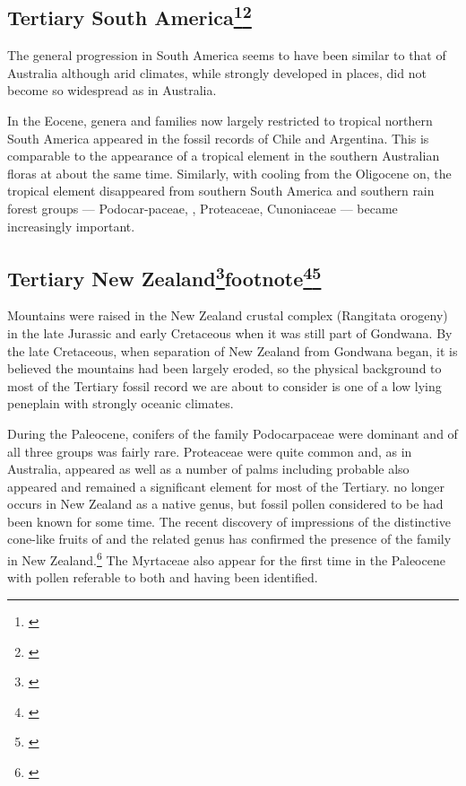 \subsection[Tertiary South America]{Tertiary South America\footnote{\cite{wace1965vascular}}\footnote{\cite{kemp1978tertiary}}}

The general progression in South America seems to have been similar to that of Australia although arid climates, while strongly developed in places, did not become so widespread as in Australia.

In the Eocene, genera and families now largely restricted to tropical northern South America appeared in the fossil records of Chile and Argentina.
This is comparable to the appearance of a tropical element in the southern Australian floras at about the same time.
Similarly, with cooling from the Oligocene on, the tropical element disappeared from southern South America and southern rain forest groups — Podocar-paceae, , Proteaceae, Cunoniaceae — became increasingly important.

\subsection[Tertiary New Zealand]{Tertiary New Zealand\footnote{\cite{mildenhall1980new}}footnote{\cite{fleming1979geological}}\footnote{\cite{mildenhall1984palaeobotanical}}\footnote{\cite{pocknall1984late}}}

Mountains were raised in the New Zealand crustal complex (Rangitata orogeny) in the late Jurassic and early Cretaceous when it was still part of Gondwana.
By the late Cretaceous, when separation of New Zealand from Gondwana began, it is believed the mountains had been largely eroded, so the physical background to most of the Tertiary fossil record we are about to consider is one of a low lying peneplain with strongly oceanic climates.

During the Paleocene, conifers of the family Podocarpaceae were dominant and  of all three groups was fairly rare.
Proteaceae were quite common and, as in Australia,  appeared as well as a number of palms including probable  also appeared and remained a significant element for most of the Tertiary.  no longer occurs in New Zealand as a native genus, but fossil pollen considered to be  had been known for some time.
The recent discovery of impressions of the distinctive cone-like fruits of  and the related genus  has confirmed the presence of the family in New Zealand.\footnote{\cite{campbell1985megafossils}}
The Myrtaceae also appear for the first time in the Paleocene with pollen referable to both  and  having been identified.

